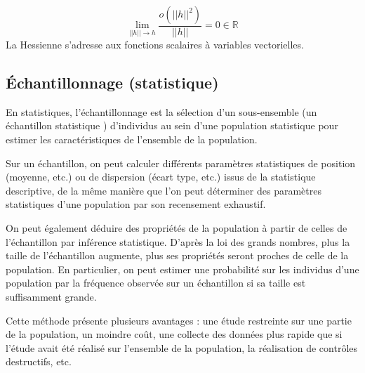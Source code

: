 		$$
			\lim\limits_{||h|| \to h} \frac{o(||h||^2)}{||h||} = 0  \in \mathbb{R}
		$$
		La Hessienne s’adresse aux fonctions scalaires à variables vectorielles.
	\subsection{Échantillonnage (statistique)} %

		
		En statistiques, l'échantillonnage est la sélection d'un sous-ensemble (un échantillon statistique ) d'individus au sein d'une population statistique pour estimer les caractéristiques de l'ensemble de la population. 
		
		
		Sur un échantillon, on peut calculer différents paramètres statistiques de position (moyenne, etc.) ou de dispersion (écart type, etc.) issus de la statistique descriptive, de la même manière que l'on peut déterminer des paramètres statistiques d'une population par son recensement exhaustif.
		
		On peut également déduire des propriétés de la population à partir de celles de l'échantillon par inférence statistique. D'après la loi des grands nombres, plus la taille de l'échantillon augmente, plus ses propriétés seront proches de celle de la population. En particulier, on peut estimer une probabilité sur les individus d'une population par la fréquence observée sur un échantillon si sa taille est suffisamment grande. 
		
		Cette méthode présente plusieurs avantages : une étude restreinte sur une partie de la population, un moindre coût, une collecte des données plus rapide que si l'étude avait été réalisé sur l'ensemble de la population, la réalisation de contrôles destructifs, etc.
		
